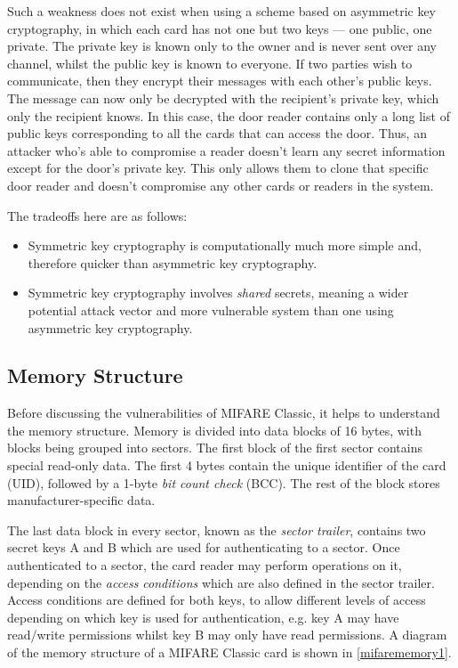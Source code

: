 \documentclass[12pt,a4paper,twoside,openright]{report}
\begin{document}
Such a weakness does not exist when using a scheme based on asymmetric key cryptography, in which each card has not one but two keys --- one public, one private. The private key is known only to the owner and is never sent over any channel, whilst the public key is known to everyone. If two parties wish to communicate, then they encrypt their messages with each other's public keys. The message can now only be decrypted with the recipient's private key, which only the recipient knows. In this case, the door reader contains only a long list of public keys corresponding to all the cards that can access the door. Thus, an attacker who's able to compromise a reader doesn't learn any secret information except for the door's private key. This only allows them to clone that specific door reader and doesn't compromise any other cards or readers in the system.

The tradeoffs here are as follows:

\begin{itemize}
\item Symmetric key cryptography is computationally much more simple and, therefore quicker than asymmetric key cryptography.
\item Symmetric key cryptography involves \emph{shared} secrets, meaning a wider potential attack vector and more vulnerable system than one using asymmetric key cryptography.
\end{itemize}

\subsection{Memory Structure}

Before discussing the vulnerabilities of MIFARE Classic, it helps to understand the memory structure. Memory is divided into data blocks of 16 bytes, with blocks being grouped into sectors. The first block of the first sector contains special read-only data. The first 4 bytes contain the unique identifier of the card (UID), followed by a 1-byte \emph{bit count check} (BCC). The rest of the block stores manufacturer-specific data.

The last data block in every sector, known as the \emph{sector trailer}, contains two secret keys A and B which are used for authenticating to a sector. Once authenticated to a sector, the card reader may perform operations on it, depending on the \emph{access conditions} which are also defined in the sector trailer. Access conditions are defined for both keys, to allow different levels of access depending on which key is used for authentication, e.g. key A may have read/write permissions whilst key B may only have read permissions. A diagram of the memory structure of a MIFARE Classic card is shown in \autoref{mifarememory1}.
\end{document}
